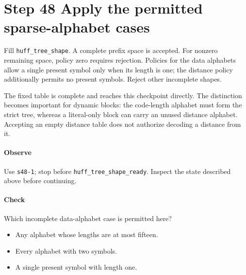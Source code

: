 \section{Step 48 Apply the permitted sparse-alphabet cases}\label{png-huff-s48}
Fill \texttt{huff\_tree\_shape}. A complete prefix space is accepted. For nonzero remaining space, policy zero requires rejection. Policies for the data alphabets allow a single present symbol only when its length is one; the distance policy additionally permits no present symbols. Reject other incomplete shapes.

The fixed table is complete and reaches this checkpoint directly. The distinction becomes important for dynamic blocks: the code-length alphabet must form the strict tree, whereas a literal-only block can carry an unused distance alphabet. Accepting an empty distance table does not authorize decoding a distance from it.

\paragraph{Observe} Use \texttt{s48-1}; stop before \texttt{huff\_tree\_shape\_ready}. Inspect the state described above before continuing.

\paragraph{Check} Which incomplete data-alphabet case is permitted here?
\begin{itemize}
\item[A.] Any alphabet whose lengths are at most fifteen.
\item[B.] Every alphabet with two symbols.
\item[C.] A single present symbol with length one.
\end{itemize}
